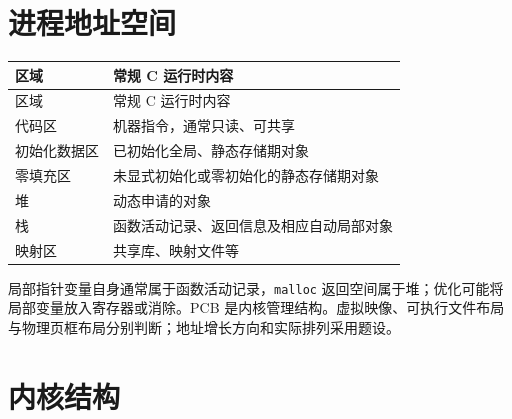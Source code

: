 \section{进程地址空间}\label{OS01-address-space}

\par\smallskip
{\fontsize{9.3}{12}\selectfont\setlength{\tabcolsep}{2.5pt}\setlength{\LTleft}{0pt}\setlength{\LTright}{0pt}
\begin{longtable}{@{}>{\raggedright\arraybackslash}p{}>{\raggedright\arraybackslash}p{}@{}}
\toprule
区域 & 常规 C 运行时内容 \\

\midrule\endfirsthead\toprule
区域 & 常规 C 运行时内容 \\

\midrule\endhead\bottomrule\endfoot
代码区 & 机器指令，通常只读、可共享 \\

初始化数据区 & 已初始化全局、静态存储期对象 \\

零填充区 & 未显式初始化或零初始化的静态存储期对象 \\

堆 & 动态申请的对象 \\

栈 & 函数活动记录、返回信息及相应自动局部对象 \\

映射区 & 共享库、映射文件等 \\

\end{longtable}}
\par\smallskip

局部指针变量自身通常属于函数活动记录，\texttt{malloc} 返回空间属于堆；优化可能将局部变量放入寄存器或消除。PCB 是内核管理结构。虚拟映像、可执行文件布局与物理页框布局分别判断；地址增长方向和实际排列采用题设。

\section{内核结构}\label{OS01-kernel-structures}

